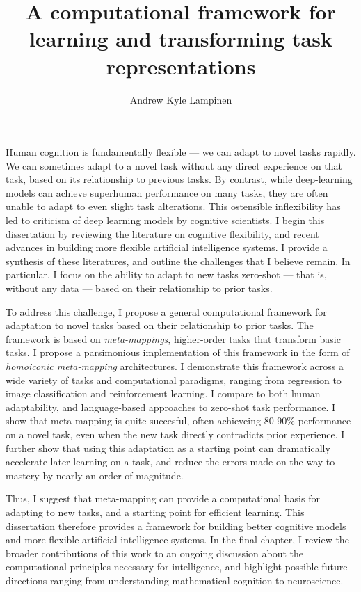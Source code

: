 \documentclass{report}
\begin{document}
\title{A computational framework for learning and transforming task representations}
\author{Andrew Kyle Lampinen}

\beforepreface
\setcounter{page}{4}  %

Human cognition is fundamentally flexible --- we can adapt to novel tasks rapidly. We can sometimes adapt to a novel task without any direct experience on that task, based on its relationship to previous tasks. By contrast, while deep-learning models can achieve superhuman performance on many tasks, they are often unable to adapt to even slight task alterations. This ostensible inflexibility has led to criticism of deep learning models by cognitive scientists. I begin this dissertation by reviewing the literature on cognitive flexibility, and recent advances in building more flexible artificial intelligence systems. I provide a synthesis of these literatures, and outline the challenges that I believe remain. In particular, I focus on the ability to adapt to new tasks zero-shot --- that is, without any data --- based on their relationship to prior tasks.\par
To address this challenge, I propose a general computational framework for adaptation to novel tasks based on their relationship to prior tasks. The framework is based on \emph{meta-mappings}, higher-order tasks that transform basic tasks. I propose a parsimonious implementation of this framework in the form of \emph{homoiconic meta-mapping} architectures. I demonstrate this framework across a wide variety of tasks and computational paradigms, ranging from regression to image classification and reinforcement learning. I compare to both human adaptability, and language-based approaches to zero-shot task performance. I show that meta-mapping is quite succesful, often achieveing 80-90\% performance on a novel task, even when the new task directly contradicts prior experience. I further show that using this adaptation as a starting point can dramatically accelerate later learning on a task, and reduce the errors made on the way to mastery by nearly an order of magnitude. \par
Thus, I suggest that meta-mapping can provide a computational basis for adapting to new tasks, and a starting point for efficient learning. This dissertation therefore provides a framework for building better cognitive models and more flexible artificial intelligence systems. In the final chapter, I review the broader contributions of this work to an ongoing discussion about the computational principles necessary for intelligence, and highlight possible future directions ranging from understanding mathematical cognition to neuroscience. 
\end{document}
